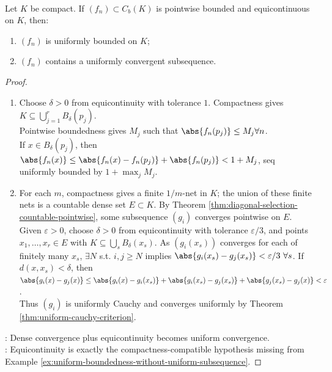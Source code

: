 \begin{theorem} \label{thm:arzela-ascoli-compact-metric} \\
Let $K$ be compact. If $(f_n)\subset C_b(K)$ is pointwise bounded and equicontinuous on $K$, then:
\begin{enumerate}[label=(\roman*)]
\setlength{\itemsep}{0pt}
\item $(f_n)$ is uniformly bounded on $K$;
\item $(f_n)$ contains a uniformly convergent subsequence.
\end{enumerate}
\begin{proof}
\begin{enumerate}[label=(\roman*)]
\setlength{\itemsep}{0pt}
\item Choose $\delta>0$ from equicontinuity with tolerance $1$. Compactness gives $K\subseteq\bigcup_{j=1}^{r}B_{\delta}(p_j)$.\\
Pointwise boundedness gives $M_j$ such that $\abs{f_n(p_j)}\leq M_j \forall n$.\\
If $x\in B_{\delta}(p_j)$, then $\abs{f_n(x)}\leq\abs{f_n(x)-f_n(p_j)}+\abs{f_n(p_j)}<1+M_j$, seq uniformly bounded by $1+\max_jM_j$.
\item For each $m$, compactness gives a finite $1/m$-net in $K$; the union of these finite nets is a countable dense set $E\subset K$. By Theorem \ref{thm:diagonal-selection-countable-pointwise}, some subsequence $(g_i)$ converges pointwise on $E$.\\
Given $\varepsilon>0$, choose $\delta>0$ from equicontinuity with tolerance $\varepsilon/3$, and points $x_1,\ldots,x_r\in E$ with $K\subseteq\bigcup_sB_{\delta}(x_s)$. As $(g_i(x_s))$ converges for each of finitely many $x_s$, $\exists N$ s.t. $i,j\geq N$ implies $\abs{g_i(x_s)-g_j(x_s)}<\varepsilon/3 \ \forall s$. If $d(x,x_s)<\delta$, then $\abs{g_i(x)-g_j(x)} \leq\abs{g_i(x)-g_i(x_s)}+\abs{g_i(x_s)-g_j(x_s)}+\abs{g_j(x_s)-g_j(x)} <\varepsilon$.\\
Thus $(g_i)$ is uniformly Cauchy and converges uniformly by Theorem \ref{thm:uniform-cauchy-criterion}.
\end{enumerate}
: Dense convergence plus equicontinuity becomes uniform convergence.\\
: Equicontinuity is exactly the compactness-compatible hypothesis missing from Example \ref{ex:uniform-boundedness-without-uniform-subsequence}.
\end{proof}
\end{theorem}

